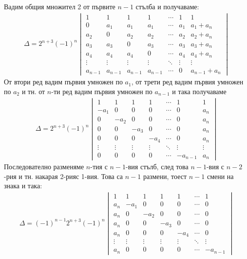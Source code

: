 \documentclass[a4paper, 12pt, oneside]{article}
\begin{document}
Вадим общия множител 2 от първите \(n - 1\) стълба и получаваме:
\begin{align*}
\Delta = 2^{n + 3}(-1)^n\begin{vmatrix}
    1 & 1 & 1 & 1 & \cdots & 1  & 1 \\
    0 & a_1 & a_1 & a_1 & \cdots & a_1 & a_1 + a_n \\
    a_2 & 0 & a_2 & a_2 & \cdots & a_2 & a_2 + a_n \\
    a_3 & a_3 & 0 & a_3 & \cdots & a_3 & a_3 + a_n \\
    a_4 & a_4 & a_4 & 0 & \cdots & a_4 & a_4 + a_n \\
    \vdots & \vdots & \vdots & \vdots & \ddots & \vdots & \vdots \\
    a_{n - 1} & a_{n - 1} & a_{n - 1} & a_{n - 1} & \cdots & 0 & a_{n - 1} + a_n
\end{vmatrix}
\end{align*}
От втори ред вадим първия умножен по \(a_1\), от трети ред вадим първия умножен по \(a_2\) и тн.
от \(n\)-ти ред вадим първия умножен по \(a_{n - 1}\) и така получаваме
\begin{align*}
\Delta = 2^{n + 3}(-1)^n\begin{vmatrix}
    1 & 1 & 1 & 1 & \cdots & 1  & 1 \\
    -a_1 & 0 & 0 & 0 & \cdots & 0 & a_n \\
    0 & -a_2 & 0 & 0 & \cdots & 0 & a_n \\
    0 & 0 & -a_3 & 0 & \cdots & 0 & a_n \\
    0 & 0 & 0 & -a_4 & \cdots & 0 & a_n \\
    \vdots & \vdots & \vdots & \vdots & \ddots & \vdots & \vdots \\
    0 & 0 & 0 & 0 & \cdots & -a_{n - 1} & a_n
\end{vmatrix}
\end{align*}
Последователно разменяме \(n\)-тия с \(n - 1\)-вия стълб, след това \(n - 1\)-вия с \(n - 2\)-рия и тн. накарая 2-рияс 1-вия.
Това са \(n - 1\) размени, тоест \(n - 1\) смени на знака и така:
\begin{align*}
\Delta = (-1)^{n - 1}2^{n + 3}(-1)^n\begin{vmatrix}
    1 & 1 & 1 & 1 & 1 & \cdots & 1 \\
    a_n & -a_1 & 0 & 0 & 0 & \cdots & 0 \\
    a_n & 0 & -a_2 & 0 & 0 & \cdots & 0 \\
    a_n & 0 & 0 & -a_3 & 0 & \cdots & 0 \\
    a_n & 0 & 0 & 0 & -a_4 & \cdots & 0 \\
    \vdots & \vdots & \vdots & \vdots & \vdots & \ddots & \vdots \\
    a_n & 0 & 0 & 0 & 0 & \cdots & -a_{n - 1}
\end{vmatrix}
\end{align*}
\end{document}
